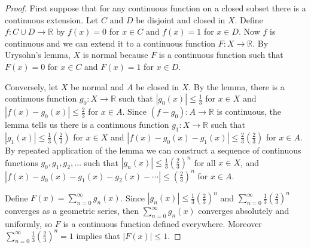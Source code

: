 \documentclass[12pt]{article}
\newcommand*{\abs}[1]{\left\lvert #1\right\rvert}
\begin{document}
\renewcommand{\proofname}{Proof of the Tietze extension theorem}
\begin{proof}
First suppose that for any continuous function on a closed subset there is a continuous extension. Let $C$ and $D$ be disjoint and closed in $X$. Define $f\colon C\cup D\to\mathbb{R}$ by $f(x)=0$ for $x\in C$ and $f(x)=1$ for $x\in D$. Now $f$ is continuous and we can extend it to a continuous function $F\colon X\to\mathbb{R}$. By Urysohn's lemma, $X$ is normal because $F$ is a continuous function such that $F(x)=0$ for $x\in C$ and $F(x)=1$ for $x\in D$.

Conversely, let $X$ be normal and $A$ be closed in $X$. By the lemma, there is a continuous function $g_0\colon X\rightarrow\mathbb{R}$ such that $\abs{g_0(x)}\leq\frac{1}{3}$ for $x\in X$ and $\abs{f(x)-g_0(x)}\leq\frac{2}{3}$ for $x\in A$. Since $(f-g_0)\colon A\rightarrow\mathbb{R}$ is continuous, the lemma tells us there is a continuous function $g_1\colon X\rightarrow\mathbb{R}$ such that $\abs{g_1(x)}\leq\frac{1}{3}(\frac{2}{3})$ for $x\in X$ and $\abs{f(x)-g_0(x)-g_1(x)}\leq\frac{2}{3}(\frac{2}{3})$ for $x\in A$. By repeated application of the lemma we can construct a sequence of continuous functions $g_0,g_1,g_2,\dotsc$ such that $\abs{g_n(x)}\leq \frac{1}{3}(\frac{2}{3})^n$ for all $x\in X$, and $\abs{f(x)-g_0(x)-g_1(x)-g_2(x)-\dotsb}\leq (\frac{2}{3})^n$ for $x\in A$.

Define $F(x)=\sum_{n=0}^\infty g_n(x)$. Since $\abs{g_n(x)}\leq\frac{1}{3}(\frac{2}{3})^n$ and $\sum_{n=0}^\infty\frac{1}{3}(\frac{2}{3})^n$ converges as a geometric series, then $\sum_{n=0}^\infty g_n(x)$ converges absolutely and uniformly, so $F$ is a continuous function defined everywhere. Moreover $\sum_{n=0}^\infty\frac{1}{3}(\frac{2}{3})^n=1$ implies that $\abs{F(x)}\leq 1$.


\end{proof}
\end{document}
